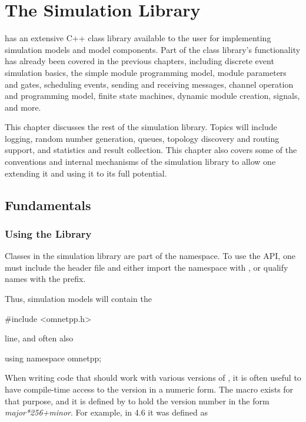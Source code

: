 \chapter{The Simulation Library}
\label{cha:sim-lib}

{\opp} has an extensive C++ class library available to the user for
implementing simulation models and model components. Part of the class
library's functionality has already been covered in the previous chapters,
including discrete event simulation basics, the simple module programming
model, module parameters and gates, scheduling events, sending and
receiving messages, channel operation and programming model, finite state
machines, dynamic module creation, signals, and more.

This chapter discusses the rest of the simulation library. Topics will
include logging, random number generation, queues, topology discovery and
routing support, and statistics and result collection. This chapter also
covers some of the conventions and internal mechanisms of the simulation
library to allow one extending it and using it to its full potential.


\section{Fundamentals}
\label{sec:sim-lib:fundamentals}

\subsection{Using the Library}
\label{sec:sim-lib:using-omnetpp-library}

Classes in the {\opp} simulation library are part of the 
namespace. To use the {\opp} API, one must include the 
header file and either import the namespace with , or qualify names with the  prefix.

Thus, simulation models will contain the

\begin{cpp}
#include <omnetpp.h>
\end{cpp}

line, and often also

\begin{cpp}
using namespace omnetpp;
\end{cpp}

When writing code that should work with various versions of {\opp}, it is
often useful to have compile-time access to the {\opp} version in a numeric
form. The  macro exists for that purpose, and it is
defined by {\opp} to hold the version number in the form
\textit{major*256+minor}. For example, in {\opp} 4.6 it was defined as

